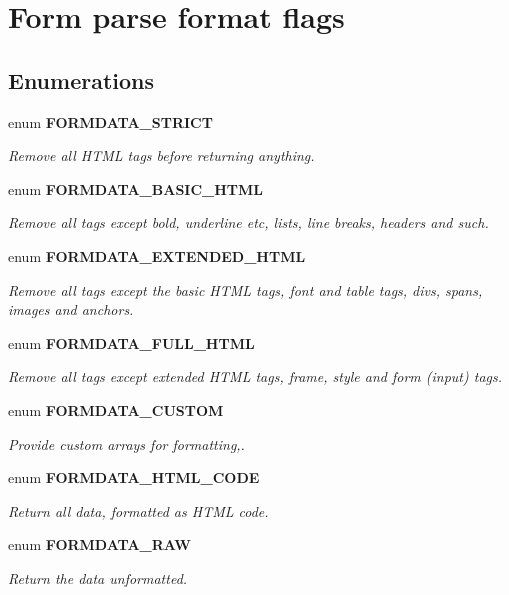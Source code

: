 \section{Form parse format flags}
\label{group__FORM__ParseFlags}
\subsection*{Enumerations}
\begin{DoxyCompactItemize}
\item 
enum {\bf FORMDATA\_\-STRICT} 
\begin{DoxyCompactList}\small\item\em Remove all HTML tags before returning anything. \end{DoxyCompactList}\item 
enum {\bf FORMDATA\_\-BASIC\_\-HTML} 
\begin{DoxyCompactList}\small\item\em Remove all tags except bold, underline etc, lists, line breaks, headers and such. \end{DoxyCompactList}\item 
enum {\bf FORMDATA\_\-EXTENDED\_\-HTML} 
\begin{DoxyCompactList}\small\item\em Remove all tags except the basic HTML tags, font and table tags, divs, spans, images and anchors. \end{DoxyCompactList}\item 
enum {\bf FORMDATA\_\-FULL\_\-HTML} 
\begin{DoxyCompactList}\small\item\em Remove all tags except extended HTML tags, frame, style and form (input) tags. \end{DoxyCompactList}\item 
enum {\bf FORMDATA\_\-CUSTOM} 
\begin{DoxyCompactList}\small\item\em Provide custom arrays for formatting,. \end{DoxyCompactList}\item 
enum {\bf FORMDATA\_\-HTML\_\-CODE} 
\begin{DoxyCompactList}\small\item\em Return all data, formatted as HTML code. \end{DoxyCompactList}\item 
enum {\bf FORMDATA\_\-RAW} 
\begin{DoxyCompactList}\small\item\em Return the data unformatted. \end{DoxyCompactList}\end{DoxyCompactItemize}


